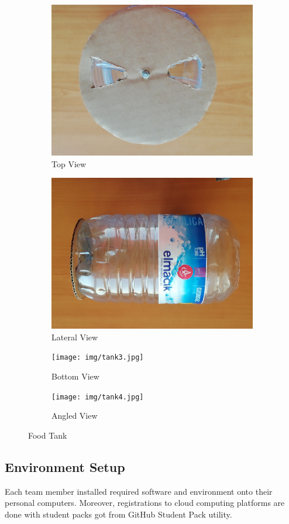 \begin{figure}
    \centering
    \begin{subfigure}[b]{0.49\textwidth}
        \includegraphics[width=\textwidth]{img/tank1.jpg}
        \caption{Top View}
        \label{fig:mamaKabi1}
    \end{subfigure}
    \begin{subfigure}[b]{0.49\textwidth}
        \includegraphics[width=\textwidth]{img/tank2.jpg}
        \caption{Lateral View}
        \label{fig:mamaKabi2}
    \end{subfigure}
    \begin{subfigure}[b]{0.49\textwidth}
        \texttt{[image: img/tank3.jpg]}
        \caption{Bottom View}
        \label{fig:mamaKabi3}
    \end{subfigure}
     \begin{subfigure}[b]{0.49\textwidth}
        \texttt{[image: img/tank4.jpg]}
        \caption{Angled View}
        \label{fig:mamaKabi3}
    \end{subfigure}
    \caption{Food Tank}
    \label{fig:mamaKabi}
\end{figure}

\subsection{Environment Setup}
Each team member installed required software and environment onto their personal computers. Moreover, registrations to cloud computing platforms are done with student packs got from GitHub Student Pack utility\cite{cite:github_studentPack}.